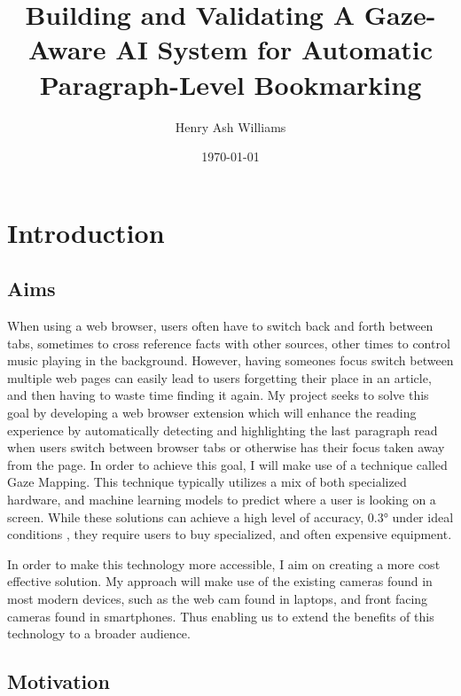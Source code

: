 \documentclass[twocolumn]{report}
\title{Building and Validating A Gaze-Aware AI System for Automatic Paragraph-Level Bookmarking}
\author{Henry Ash Williams}
\date{\today}
\begin{document}
\maketitle
\tableofcontents

\chapter{Introduction}


\section{Aims}


When using a web browser, users often have to switch back and forth between tabs, sometimes to cross reference facts with other sources, other times to control music playing in the background. However, having someones focus switch between multiple web pages can easily lead to users forgetting their place in an article, and then having to waste time finding it again. My project seeks to solve this goal by developing a web browser extension which will enhance the reading experience by automatically detecting and highlighting the last paragraph read when users switch between browser tabs or otherwise has their focus taken away from the page. In order to achieve this goal, I will make use of a technique called Gaze Mapping. This technique typically utilizes a mix of both specialized hardware, and machine learning models to predict where a user is looking on a screen. While these solutions can achieve a high level of accuracy, $\ang{0.3}$ under ideal conditions \cite{tobiiprofusion}, they require users to buy specialized, and often expensive equipment. 

In order to make this technology more accessible, I aim on creating a more cost effective solution. My approach will make use of the existing cameras found in most modern devices, such as the web cam found in laptops, and front facing cameras found in smartphones. Thus enabling us to extend the benefits of this technology to a broader audience. 

\section{Motivation}
\end{document}
